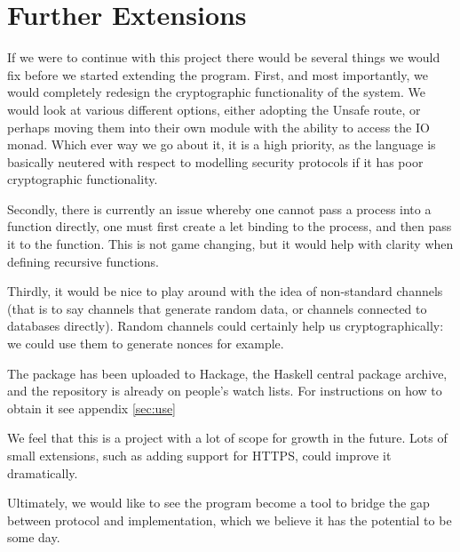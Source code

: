\section{Further Extensions}
\label{sec:extension}
If we were to continue with this project there would be several things we would fix before we started extending the program. 
First, and most importantly, we would completely redesign the cryptographic functionality of the system. We would look at various different options, either adopting the Unsafe route, or perhaps moving them into their own module with the ability to access the IO monad. Which ever way we go about it, it is a high priority, as the language is basically neutered with respect to modelling security protocols if it has poor cryptographic functionality.

Secondly, there is currently an issue whereby one cannot pass a process into a function directly, one must first create a let binding to the process, and then pass it to the function. This is not game changing, but it would help with clarity when defining recursive functions.

Thirdly, it would be nice to play around with the idea of non-standard channels (that is to say channels that generate random data, or channels connected to databases directly). Random channels could certainly help us cryptographically: we could use them to generate nonces for example.

The package has been uploaded to Hackage, the Haskell central package archive, and the repository is already on people's watch lists. For instructions on how to obtain it see appendix \ref{sec:use}

We feel that this is a project with a lot of scope for growth in the future. Lots of small extensions, such as adding support for HTTPS, could improve it dramatically.

Ultimately, we would like to see the program become a tool to bridge the gap between protocol and implementation, which we believe it has the potential to be some day.
